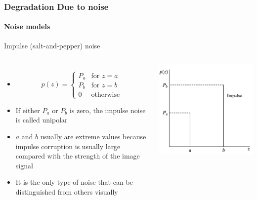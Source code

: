 \documentclass{beamer}
\begin{document}
\begin{frame}	
\frametitle{Degradation Due to noise}
\framesubtitle{Noise models}
\begin{block}{Impulse (salt-and-pepper) noise}
\begin{columns}
\scriptsize{
\begin{itemize}
	\item [] 
		\[
 	p(z) = 
  	\begin{cases} 
   	P_{a} & \text{for } z=a \\
   	P_{b} & \text{for } z=b \\
   	0 & \text{otherwise} 
  	\end{cases}
	\]
	\item If either $P_{a}$ or $P_{b}$ is zero, the impulse noise is called unipolar
	\item $a$ and $b$ usually are extreme values because impulse corruption is usually large compared with the strength of the image signal
	\item It is the only type of noise that can be distinguished from others visually
\end{itemize}
}
\includegraphics[scale=0.22]{images/L5_DR_SP1.png}
\end{columns}		
\end{block}
\end{frame}
\end{document}
